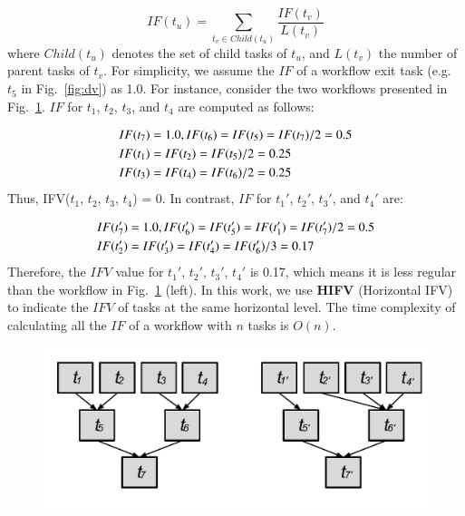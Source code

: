 \documentclass[final,5p,times,twocolumn]{elsarticle}
\begin{document}

\begin{equation}
	IF(t_u)=\sum_{t_v\in Child(t_u)}^{}\frac{IF(t_v)}{L(t_v)}
\end{equation}
where $Child(t_u)$ denotes the set of child tasks of $t_u$, and $L(t_v)$ the number of parent tasks of $t_v$. For simplicity, we assume the $IF$ of a workflow exit task (e.g. $t_5$ in Fig.~\ref{fig:dv}) as 1.0. For instance, consider the two workflows presented in Fig.~\ref{fig:hifv}. $IF$ for $t_1$, $t_2$, $t_3$, and $t_4$ are computed as follows:

\begin{eqnarray}
	\displaystyle  
	&IF(t_7 )=1.0, IF(t_6 )=IF(t_5 )=IF(t_7 )/2=0.5\nonumber  \\
	&IF(t_1 )=IF(t_2 )=IF(t_5 )/2=0.25\nonumber \\
	&IF(t_3 )=IF(t_4 )=IF(t_6 )/2=0.25\nonumber 
\end{eqnarray}
Thus, IFV($t_1$, $t_2$, $t_3$, $t_4$) = 0. In contrast, $IF$ for $t_1'$, $t_2'$, $t_3'$, and $t_4'$ are:

\begin{eqnarray}
	\displaystyle  
	&IF(t_7')=1.0, IF(t_6')=IF(t_5')=IF(t_1')=IF(t_7')/2=0.5\nonumber \\
	&IF(t_2')=IF(t_3')=IF(t_4')=IF(t_6')/3=0.17 \nonumber
\end{eqnarray}
Therefore, the $IFV$ value for {$t_1'$, $t_2'$, $t_3'$, $t_4'$} is 0.17, which means it is less regular than the workflow in Fig.~\ref{fig:hifv} (left). In this work, we use \textbf{HIFV} (Horizontal IFV) to indicate the $IFV$ of tasks at the same horizontal level. The time complexity of calculating all the $IF$ of a workflow with $n$ tasks is $O(n)$.  



\begin{figure}[htb]
	\centering
	\includegraphics[width=0.85\linewidth]{figure/hifv.pdf}
	\label{fig:hifv}
	\vspace{-10pt}
\end{figure}
\end{document}
